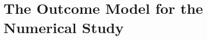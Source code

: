 \documentclass[USenglish,onecolumn]{article}
\DeclareMathOperator\Cov{Cov}
\renewcommand\r{\right}
\renewcommand\l{\left}
\newcommand\cZ{\mathcal{Z}}
\newcommand\E{\mathbb{E}}
\newcommand\bX{\bm{X}}
\begin{document}


\section{The Outcome Model for the Numerical Study}
\label{app:sim}
\end{document}

